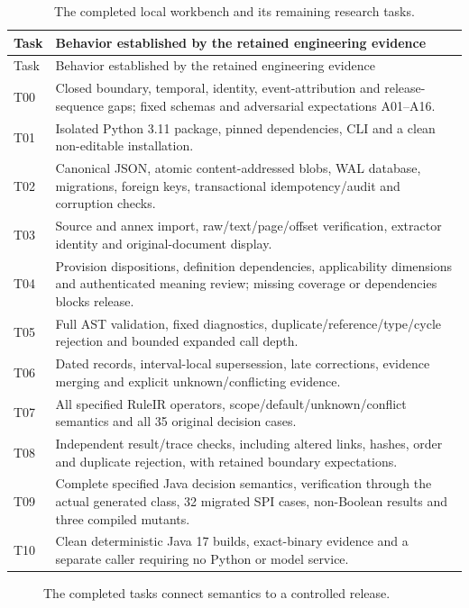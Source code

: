 \begingroup\small
\begin{longtable}{@{}P{0.09\textwidth}P{0.86\textwidth}@{}}
\caption{The completed local workbench and its remaining research tasks.}
\label{tab:executed-tasks}\\
\toprule Task & Behavior established by the retained engineering evidence \\\midrule
\endfirsthead
\toprule Task & Behavior established by the retained engineering evidence \\\midrule
\endhead
T00 & Closed boundary, temporal, identity, event-attribution and release-sequence gaps; fixed schemas and adversarial expectations A01--A16.\\
T01 & Isolated Python 3.11 package, pinned dependencies, CLI and a clean non-editable installation.\\
T02 & Canonical JSON, atomic content-addressed blobs, WAL database, migrations, foreign keys, transactional idempotency/audit and corruption checks.\\
T03 & Source and annex import, raw/text/page/offset verification, extractor identity and original-document display.\\
T04 & Provision dispositions, definition dependencies, applicability dimensions and authenticated meaning review; missing coverage or dependencies blocks release.\\
T05 & Full AST validation, fixed diagnostics, duplicate/reference/type/cycle rejection and bounded expanded call depth.\\
T06 & Dated records, interval-local supersession, late corrections, evidence merging and explicit unknown/conflicting evidence.\\
T07 & All specified RuleIR operators, scope/default/unknown/conflict semantics and all 35 original decision cases.\\
T08 & Independent result/trace checks, including altered links, hashes, order and duplicate rejection, with retained boundary expectations.\\
T09 & Complete specified Java decision semantics, verification through the actual generated class, 32 migrated SPI cases, non-Boolean results and three compiled mutants.\\
T10 & Clean deterministic Java 17 builds, exact-binary evidence and a separate caller requiring no Python or model service.\\
\bottomrule
\end{longtable}
\begingroup\normalsize
\begin{figure}[H]
\centering
{}
\caption{The completed tasks connect semantics to a controlled release.}\label{fig:gap-execution-tasks}
\end{figure}


